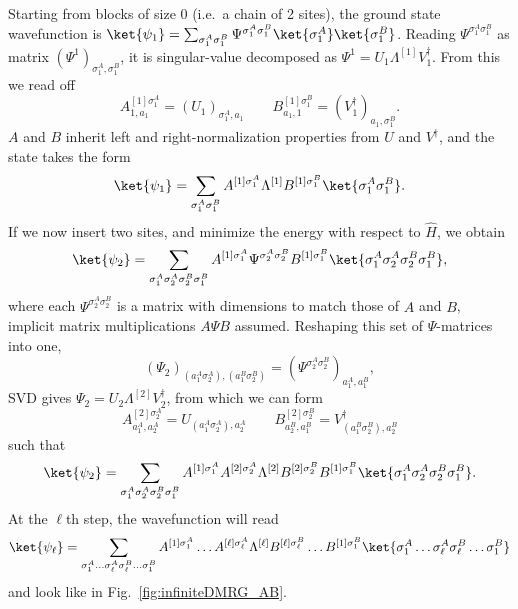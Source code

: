 Starting from blocks of size 0 (i.e.\ a chain of 2 sites), the ground state wavefunction is $\ket{\psi_1}=\sum_{\sigma_1^A \sigma_1^B} \Psi^{\sigma_1^A \sigma_1^B} \ket{\sigma_1^A} \ket{\sigma_1^B}$. Reading $\Psi^{\sigma_1^A\sigma_1^B}$ as matrix $(\Psi^1)_{\sigma_1^A,\sigma_1^B}$, it is singular-value decomposed as  $\Psi^1=U_1 \Lambda^{[1]} V^\dagger_1$. From this we read off
\begin{equation}
A^{[1]\sigma_1^A}_{1,a_1} = (U_1)_{\sigma_1^A,a_1} \quad\quad B^{[1]\sigma_1^B}_{a_1,1} = (V^\dagger_1)_{a_1,\sigma_1^B} .
\end{equation} 
$A$ and $B$ inherit left and right-normalization properties from $U$ and $V^\dagger$, and the state takes the form
\begin{equation}
\ket{\psi_1} = \sum_{\sigma_1^A \sigma_1^B} A^{[1]\sigma_1^A} \Lambda^{[1]} B^{[1]\sigma_1^B} \ket{\sigma_1^A \sigma_1^B} .
\end{equation}
If we now insert two sites, and minimize the energy with respect to $\hat{H}$, we obtain
\begin{equation}
\ket{\psi_2} = \sum_{\sigma_1^A \sigma_2^A \sigma_2^B \sigma_1^B} A^{[1]\sigma_1^A} 
\Psi^{\sigma_2^A \sigma_2^B} 
B^{[1]\sigma_1^B} \ket{\sigma_1^A \sigma_2^A \sigma_2^B \sigma_1^B},
\end{equation}
where each $\Psi^{\sigma_2^A \sigma_2^B}$ is a matrix with dimensions to match those of $A$ and $B$, implicit matrix multiplications $A\Psi B$ assumed. Reshaping this set of $\Psi$-matrices into one,
\begin{equation}
(\Psi_2)_{(a_1^A \sigma_2^A),(a_1^B \sigma_2^B)} =  (\Psi^{\sigma_2^A \sigma_2^B})_{a_1^A,a_1^B},
\end{equation}
SVD gives $\Psi_2 = U_2 \Lambda^{[2]} V^\dagger_2$, from which we can form
\begin{equation}
A^{[2]\sigma_2^A}_{a_1^A,a_2^A} = U_{(a_1^A \sigma_2^A), a_2^A} \quad\quad  
B^{[2]\sigma_2^B}_{a_2^B,a_1^B} = V^\dagger_{(a_1^B \sigma_2^B), a_2^B}
\end{equation}
such that 
\begin{equation}
\ket{\psi_2} = \sum_{\sigma_1^A \sigma_2^A \sigma_2^B \sigma_1^B} 
A^{[1]\sigma_1^A}A^{[2]\sigma_2^A} \Lambda^{[2]} B^{[2]\sigma_2^B}B^{[1]\sigma_1^B} 
\ket{\sigma_1^A \sigma_2^A \sigma_2^B \sigma_1^B}.
\end{equation}
At the $\ell$th step, the wavefunction will read
\begin{equation}
\ket{\psi_\ell} = \sum_{\sigma_1^A \ldots \sigma_\ell^A \sigma_\ell^B \ldots \sigma_1^B} 
A^{[1]\sigma_1^A} \ldots A^{[\ell]\sigma_\ell^A} \Lambda^{[\ell]} B^{[\ell]\sigma_\ell^B} \ldots B^{[1]\sigma_1^B}  
\ket{\sigma_1^A \ldots \sigma_\ell^A \sigma_\ell^B \ldots \sigma_1^B}
\end{equation}
and look like in Fig.~\ref{fig:infiniteDMRG_AB}.

